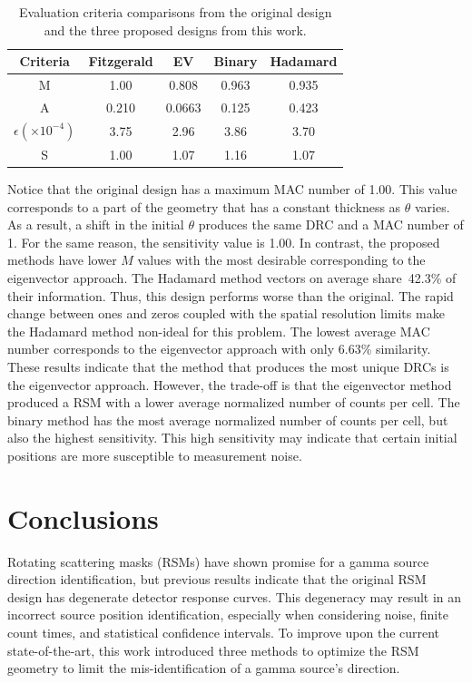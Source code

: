 \documentclass[3p,times]{elsarticle}
\begin{document}
\begin{table}[ht]
\caption{Evaluation criteria comparisons from the original design and the three proposed designs from this work.} %
\centering %
\begin{tabular}{|c|c|c|c|c|} %
\hline
Criteria & Fitzgerald & EV & Binary & Hadamard\\
\hline
M & 1.00 & 0.808 & 0.963 & 0.935\\
\hline
A & 0.210 & 0.0663 & 0.125 & 0.423 \\
\hline
$\epsilon \left(\times 10^{-4}\right)$ & 3.75 & 2.96 & 3.86 & 3.70\\
\hline
S & 1.00 & 1.07 & 1.16 & 1.07 \\
\hline
\end{tabular}
\label{table:results} %
\end{table}

Notice that the original design has a maximum MAC number of 1.00. 
This value corresponds to a part of the geometry that has a constant thickness as $\theta$ varies.  
As a result, a shift in the initial $\theta$ produces the same DRC and a MAC number of 1.  
For the same reason, the sensitivity value is 1.00.  
In contrast, the proposed methods have lower $M$ values with the most desirable corresponding to the eigenvector approach.  
The Hadamard method vectors on average share~42.3\% of their information. Thus, this design performs worse than the original. 
The rapid change between ones and zeros coupled with the spatial resolution limits make the Hadamard method non-ideal for this problem.  
The lowest average MAC number corresponds to the eigenvector approach with only 6.63\% similarity.  
These results indicate that the method that produces the most unique
DRCs is the eigenvector approach.  
However, the trade-off is that the eigenvector method produced a RSM with a lower average normalized number of counts per cell.  
The binary method has the most average normalized number of counts per cell, but also the highest sensitivity.  
This high sensitivity may indicate that certain initial positions are more susceptible to measurement noise.


\section{Conclusions} \label{sec:conclusions}
Rotating scattering masks (RSMs) have shown promise for a gamma source direction identification, 
but previous results indicate that the original RSM design has degenerate detector response curves.  
This degeneracy may result in an incorrect source position identification, especially when considering noise, finite count times, and statistical confidence intervals.
To improve upon the current state-of-the-art, this work introduced three methods to optimize the RSM geometry to limit the mis-identification of a gamma source's direction.  
\end{document}
